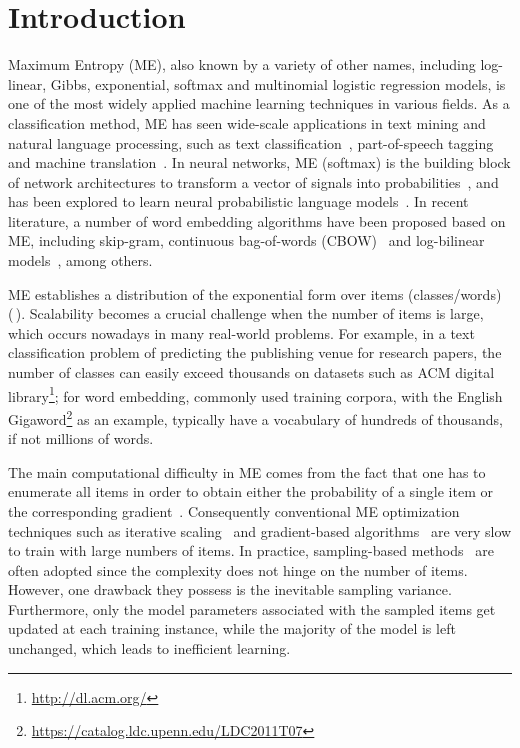 \section{Introduction}

Maximum Entropy (ME), also known by a variety of other names, including
log-linear, Gibbs, exponential, softmax and multinomial logistic regression
models, is one of the most widely applied machine learning techniques in various
fields. As a classification method, ME has seen wide-scale applications in text
mining and natural language processing, such as text
classification~\cite{nigam1999using}, part-of-speech
tagging~\cite{ratnaparkhi1996maximum} and machine
translation~\cite{berger1996maximum}. In neural networks, ME (softmax) is the
building block of network architectures to transform a vector of signals into
probabilities~\cite{collobert2008unified}, and has been explored to learn neural
probabilistic language models~\cite{bengio2003neural}. In recent literature, a
number of word embedding algorithms have been proposed based on ME, including
skip-gram, continuous bag-of-words
(CBOW)~\cite{mikolov2013efficient,mikolov2013distributed} and log-bilinear
models~\cite{mnih2007three}, among others.

ME establishes a distribution of the exponential form over items (classes/words)
(\,). Scalability becomes a crucial challenge when the number of
items is large, which occurs nowadays in many real-world problems.  For example,
in a text classification problem of predicting the publishing venue for research
papers, the number of classes can easily exceed thousands on datasets such as
ACM digital library\footnote{\url{http://dl.acm.org/}}; for word embedding,
commonly used training corpora, with the English
Gigaword\footnote{\url{https://catalog.ldc.upenn.edu/LDC2011T07}} as an example,
typically have a vocabulary of hundreds of thousands, if not millions of words.

The main computational difficulty in ME comes from the fact that one has to
enumerate all items in order to obtain either the probability of a single item
or the corresponding gradient~\cite{mnih2012fast}. Consequently conventional ME
optimization techniques such as iterative
scaling~\cite{berger1996maximum,darroch1972generalized} and gradient-based
algorithms~\cite{tsuruoka2009stochastic,gao2007comparative} are very slow to
train with large numbers of items. In practice, sampling-based
methods~\cite{gutmann2010noise,mnih2012fast,bengio2008adaptive} are often
adopted since the complexity does not hinge on the number of items. However, one
drawback they possess is the inevitable sampling variance. Furthermore, only the
model parameters associated with the sampled items get updated at each training
instance, while the majority of the model is left unchanged, which leads to
inefficient learning.

